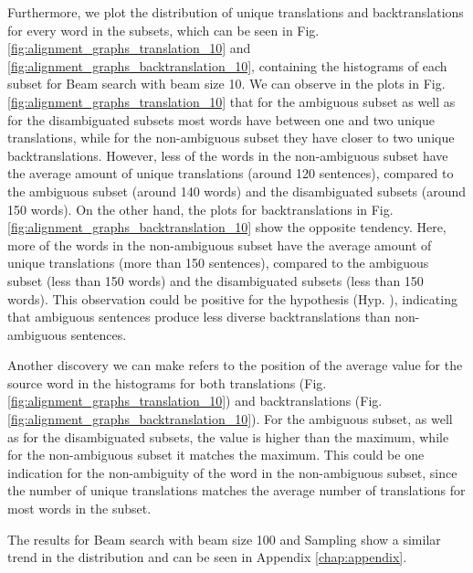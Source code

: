 Furthermore, we plot the distribution of unique translations and backtranslations for every word in the subsets, which can be seen in Fig. \ref{fig:alignment_graphs_translation_10} and \ref{fig:alignment_graphs_backtranslation_10}, containing the histograms of each subset for Beam search with beam size 10. 
We can observe in the plots in Fig. \ref{fig:alignment_graphs_translation_10} that for the ambiguous subset as well as for the disambiguated subsets most words have between one and two unique translations, while for the non-ambiguous subset they have closer to two unique backtranslations. However, less of the words in the non-ambiguous subset have the average amount of unique translations (around 120 sentences), compared to the ambiguous subset (around 140 words) and the disambiguated subsets (around 150 words). 
On the other hand, the plots for backtranslations in Fig. \ref{fig:alignment_graphs_backtranslation_10} show the opposite tendency. Here, more of the words in the non-ambiguous subset have the average amount of unique translations (more than 150 sentences), compared to the ambiguous subset (less than 150 words) and the disambiguated subsets (less than 150 words). This observation could be positive for the hypothesis (Hyp. ), indicating that ambiguous sentences produce less diverse backtranslations than non-ambiguous sentences.

Another discovery we can make refers to the position of the average value for the source word in the histograms for both translations (Fig. \ref{fig:alignment_graphs_translation_10}) and backtranslations (Fig. \ref{fig:alignment_graphs_backtranslation_10}). For the ambiguous subset, as well as for the disambiguated subsets, the value is higher than the maximum, while for the non-ambiguous subset it matches the maximum. This could be one indication for the non-ambiguity of the word in the non-ambiguous subset, since the number of unique translations matches the average number of translations for most words in the subset. 

The results for Beam search with beam size 100 and Sampling show a similar trend in the distribution and can be seen in Appendix \ref{chap:appendix}.


